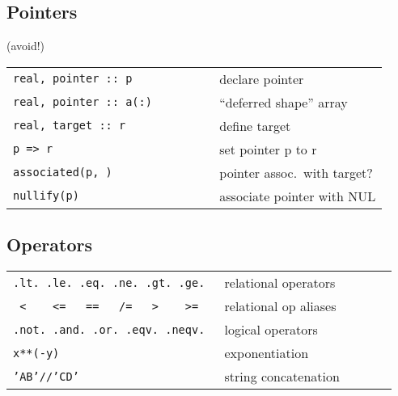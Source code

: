 \documentclass[8pt]{extarticle} %
\begin{document}
\begin{multicols}{3}
		\vspace*{1ex}
		\subsection{Pointers}
		\vspace*{-10pt}\hspace{2cm} (avoid!)
		
		\begin{tabular}{L{0.55\linewidth} L{0.45\linewidth}}
			\tt real,~pointer~::~p              & declare pointer \\
			\tt real,~pointer~::~a(:)           & ``deferred shape'' array \\
			\tt real,~target~::~r               & define target \\
			\tt p~=>~r                          & set pointer p to r \\
			\tt associated(p,~\itt{[target]})   & pointer assoc.\ with target? \\
			\tt nullify(p)                      & associate pointer with NUL
		\end{tabular}
		
		\vspace*{1ex}
		\subsection{Operators}
		\begin{tabular}{L{0.55\linewidth} L{0.45\linewidth}}
			\tt .lt.~.le.~.eq.~.ne.~.gt.~.ge.  & relational operators \\
			\tt ~<~~~~<=~~~==~~~/=~~~>~~~~>=   & relational op aliases \\
			\tt .not.\ .and.\ .or.\ .eqv.\ .neqv.   & logical operators \\
			\tt x**(-y)                             & exponentiation \\
			\tt 'AB'//'CD'                          & string concatenation
		\end{tabular}
		

\end{multicols}
\end{document}
